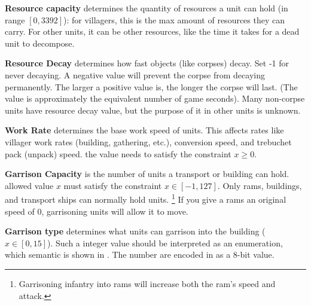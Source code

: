     \textbf{Resource capacity} determines the quantity of resources a unit can hold (in range $[0, 3392]$): for villagers, this is the max amount of resources they can carry. For other units, it can be other resources, like the time it takes for a dead unit to decompose\cite{agewiki:2014}.

    \textbf{Resource Decay} determines how fast objects (like corpses) decay. Set -1 for never decaying. A negative value will prevent the corpse from decaying permanently. The larger a positive value is, the longer the corpse will last. (The value is approximately the equivalent number of game seconds). Many non-corpse units have resource decay value, but the purpose of it in other units is unknown\cite{agewiki:2014}. 

    \textbf{Work Rate} determines the base work speed of units. This affects rates like villager work rates (building, gathering, etc.), conversion speed, and trebuchet pack (unpack) speed. the value needs to satisfy the constraint $x \geq 0$\cite{agewiki:2014}.

    \textbf{Garrison Capacity} is the number of units a transport or building can hold. allowed value $x$ must satisfy the constraint $x \in [-1, 127]$. Only rams, buildings, and transport ships can normally hold units. \footnote{Garrisoning infantry into rams will increase both the ram's speed and attack.} If you give a rams an original speed of 0, garrisoning units will allow it to move. 

    \textbf{Garrison type} determines what units can garrison into the building ($x \in [0, 15]$). Such a integer value should be interpreted as an enumeration, which semantic is shown in . The number are encoded in \genie{} as a 8-bit value\cite{agewiki:2014}.

